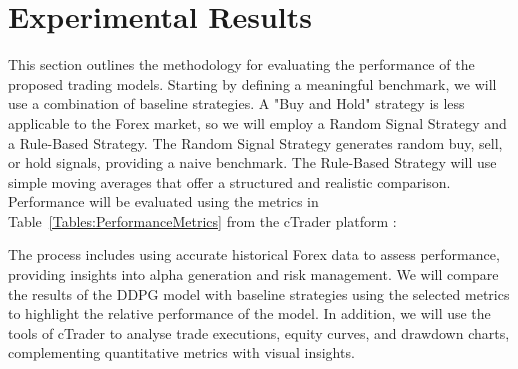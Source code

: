 \section{Experimental Results}

This section outlines the methodology for evaluating the performance of the proposed trading models. Starting by defining a meaningful benchmark, we will use a combination of baseline strategies. A "Buy and Hold" strategy is less applicable to the Forex market, so we will employ a Random Signal Strategy and a Rule-Based Strategy. The Random Signal Strategy generates random buy, sell, or hold signals, providing a naive benchmark. The Rule-Based Strategy will use simple moving averages that offer a structured and realistic comparison. Performance will be evaluated using the metrics in Table~\ref{Tables:PerformanceMetrics} from the cTrader platform :



The process includes using accurate historical Forex data to assess performance, providing insights into alpha generation and risk management. We will compare the results of the DDPG model with baseline strategies using the selected metrics to highlight the relative performance of the model. In addition, we will use the tools of cTrader to analyse trade executions, equity curves, and drawdown charts, complementing quantitative metrics with visual insights.